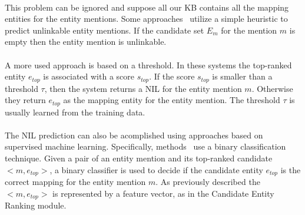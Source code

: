 \paragraph{}
This problem can be ignored and suppose all our KB contains all the mapping entities for the entity mentions. Some approaches~\cite{cucerzan2007large} utilize a simple heuristic to predict unlinkable entity mentions. If the candidate set $E_m$ for the mention $m$ is empty then the entity mention is unlinkable.
\paragraph{}
A more used approach is based on a threshold. In these systems the top-ranked entity $e_{top}$ is associated with a score $s_{top}$. If the score $s_{top}$ is smaller than a threshold $\tau$, then the system returns a NIL for the entity mention $m$. Otherwise they return $e_{top}$ as the mapping entity for the entity mention. The threshold $\tau$ is usually learned from the training data.
\paragraph{}
The NIL prediction can also be acomplished using approaches based on supervised machine learning. Specifically, methods~\cite{ratinov2011local, zheng2010learning} use a binary classification technique. Given a pair of an entity mention and its top-ranked candidate $<\!\!m, e_{top}\!\!>$, a binary classifier is used to decide if the candidate entity $e_{top}$ is the correct mapping for the entity mention $m$. As previously described the $<\!\!m, e_{top}\!\!>$ is represented by a feature vector, as in the Candidate Entity Ranking module.
